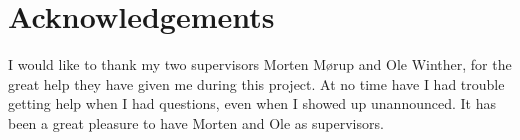 \chapter*{Acknowledgements}

I would like to thank my two supervisors Morten Mørup and Ole Winther, for the great help they have given me during this project.
At no time have I had trouble getting help when I had questions, even when I showed up unannounced. It has been a great pleasure to have Morten and Ole as supervisors.
